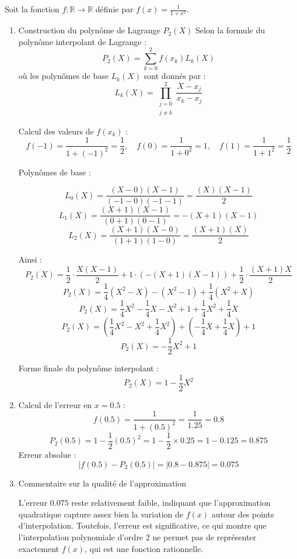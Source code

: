 \documentclass[10pt,a4paper]{article}
\begin{document}
\q Soit la fonction \( f : \mathbb{R} \to \mathbb{R} \) définie par \( f(x) = \frac{1}{1 + x^2} \).

\begin{enumerate}
   \item Construction du polynôme de Lagrange \( P_2(X) \)
   Selon la formule du polynôme interpolant de Lagrange :
   \[
    P_2(X) = \sum_{k=0}^{2} f(x_k) L_k(X)
    \]
    où les polynômes de base \( L_k(X) \) sont donnés par :
    \[
    L_k(X) = \prod_{\substack{j=0 \\ j\neq k}}^{2} \frac{X - x_j}{x_k - x_j}
    \]

    Calcul des valeurs de \( f(x_k) \) :
    \[
    f(-1) = \frac{1}{1 + (-1)^2} = \frac{1}{2}, \quad
    f(0) = \frac{1}{1 + 0^2} = 1, \quad
    f(1) = \frac{1}{1 + 1^2} = \frac{1}{2}
    \]

    Polynômes de base :

    \[
    L_0(X) = \frac{(X - 0)(X - 1)}{(-1 - 0)(-1 - 1)} = \frac{(X)(X - 1)}{2}
    \]
    \[
    L_1(X) = \frac{(X + 1)(X - 1)}{(0 + 1)(0 - 1)} = -(X+1)(X-1)
    \]
    \[
    L_2(X) = \frac{(X + 1)(X - 0)}{(1 + 1)(1 - 0)} = \frac{(X + 1)(X)}{2}
    \]

    Ainsi :
    \[
    P_2(X) = \frac{1}{2} \cdot \frac{X(X-1)}{2} + 1 \cdot (-(X+1)(X-1)) + \frac{1}{2} \cdot \frac{(X+1)X}{2}
    \]
    \[
    P_2(X) = \frac{1}{4} (X^2 - X) - (X^2 - 1) + \frac{1}{4} (X^2 + X)
    \]
    \[
    P_2(X) = \frac{1}{4}X^2 - \frac{1}{4}X - X^2 + 1 + \frac{1}{4}X^2 + \frac{1}{4}X
    \]
    \[
    P_2(X) = \left(\frac{1}{4}X^2 - X^2 + \frac{1}{4}X^2 \right) + \left(-\frac{1}{4}X + \frac{1}{4}X \right) + 1
    \]
    \[
    P_2(X) = -\frac{1}{2}X^2 + 1
    \]

    Forme finale du polynôme interpolant  :
    \[
    P_2(X) = 1 - \frac{1}{2}X^2
    \]

    \item Calcul de l'erreur en \( x = 0.5 \) :
    \[
    f(0.5) = \frac{1}{1 + (0.5)^2} = \frac{1}{1.25} = 0.8
    \]
    \[
    P_2(0.5) = 1 - \frac{1}{2} (0.5)^2 = 1 - \frac{1}{2} \times 0.25 = 1 - 0.125 = 0.875
    \]
    Erreur absolue :
    \[
    |f(0.5) - P_2(0.5)| = |0.8 - 0.875| = 0.075
    \]

    \item Commentaire sur la qualité de l'approximation

    L'erreur \( 0.075 \) reste relativement faible, indiquant que l'approximation quadratique capture
    assez bien la variation de \( f(x) \) autour des points d'interpolation. Toutefois, l'erreur est
    significative, ce qui montre que l'interpolation polynomiale d'ordre 2 ne permet pas de représenter
    exactement \( f(x) \), qui est une fonction rationnelle.


\end{enumerate}
\end{document}
